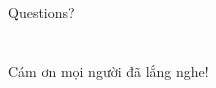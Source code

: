 \documentclass[14pt]{beamer}
\begin{document}
\section*{}
\begin{frame}
\begin{center}
\Huge Questions?
\end{center}
\end{frame}

\section*{}
\begin{frame}
    \begin{center}
        \Huge Cám ơn mọi người đã lắng nghe!
    \end{center}
\end{frame}
\end{document}
